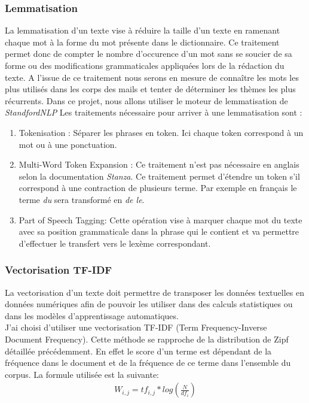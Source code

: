 \documentclass[a4paper,12pt]{article}
\begin{document}
			
		\subsubsection{Lemmatisation}
			La lemmatisation d'un texte vise à réduire la taille d'un texte en ramenant chaque mot à la forme du mot présente dans le dictionnaire. Ce traitement permet donc de compter le nombre d'occurence d'un mot sans se soucier de sa forme ou des modifications grammaticales appliquées lors de la rédaction du texte. A l'issue de ce traitement nous serons en mesure de connaître les mots les plus utilisés dans les corps des mails et tenter de déterminer les thèmes les plus récurrents.  
			Dans ce projet, nous allons utiliser le moteur de lemmatisation de \emph{StandfordNLP}\cite{manning-EtAl:2014:P14-5}\cite{qi2020stanza}
			Les traitements nécessaire pour arriver à une lemmatisation sont :
			\begin{enumerate}
				\item Tokenisation : Séparer les phrases en token. Ici chaque token correspond à un mot ou à une ponctuation.
				\item Multi-Word Token Expansion : Ce traitement n'est pas nécessaire en anglais selon la documentation \emph{Stanza}. Ce traitement permet d'étendre un token s'il correspond à une contraction de plusieurs terme. Par exemple en français le terme \emph{du} sera transformé en \emph{de le}.
				\item Part of Speech Tagging: Cette opération vise à marquer chaque mot du texte avec sa position grammaticale dans la phrase qui le contient et va permettre d'effectuer le transfert vers le lexème correspondant.
			\end{enumerate}
			
			
			
			
			
		
		\subsubsection{Vectorisation TF-IDF}
			La vectorisation d'un texte doit permettre de transposer les données textuelles en données numériques afin de pouvoir les utiliser dans des calculs statistiques ou dans les modèles d'apprentissage automatiques.\\
			J'ai choisi d'utiliser une vectorisation TF-IDF\cite{ml-python} (Term Frequency-Inverse Document Frequency). Cette méthode se rapproche de la distribution de Zipf détaillée précédemment. En effet le score d'un terme est dépendant de la fréquence dans le document et de la fréquence de ce terme dans l'ensemble du corpus. La formule utilisée est la suivante:
			\begin{align*}
				W_{i,j} = tf_{i,j}*log(\frac{N}{df_{i}})
			\end{align*}
		
\end{document}
